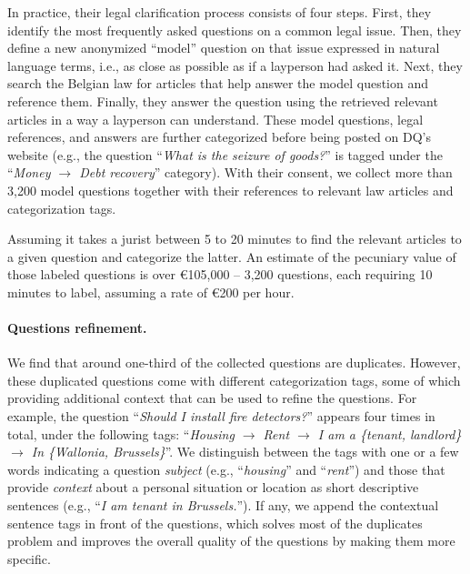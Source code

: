 \documentclass[11pt]{article}
\begin{document}
In practice, their legal clarification process consists of four steps. First, they identify the most frequently asked questions on a common legal issue. Then, they define a new anonymized “model” question on that issue expressed in natural language terms, i.e., as close as possible as if a layperson had asked it. Next, they search the Belgian law for articles that help answer the model question and reference them. Finally, they answer the question using the retrieved relevant articles in a way a layperson can understand. These model questions, legal references, and answers are further categorized before being posted on DQ’s website (e.g., the question “\textsl{What is the seizure of goods?}” is tagged under the “\textsl{Money $\rightarrow$ Debt recovery}” category). With their consent, we collect more than 3,200 model questions together with their references to relevant law articles and categorization tags. 

Assuming it takes a jurist between 5 to 20 minutes to find the relevant articles to a given question and categorize the latter. An estimate of the pecuniary value of those labeled questions is over €105,000 -- 3,200 questions, each requiring 10 minutes to label, assuming a rate of €200 per hour.

\paragraph{Questions refinement.}
We find that around one-third of the collected questions are duplicates. However, these duplicated questions come with different categorization tags, some of which providing additional context that can be used to refine the questions. For example, the question ``\textsl{Should I install fire detectors?}'' appears four times in total, under the following tags: ``\textsl{Housing $\rightarrow$ Rent $\rightarrow$ I am a \{\textit{tenant}, \textit{landlord}\} $\rightarrow$ In \{\textit{Wallonia}, \textit{Brussels}\}}''. We distinguish between the tags with one or a few words indicating a question \textit{subject} (e.g., ``\textsl{housing}'' and ``\textsl{rent}'') and those that provide \textit{context} about a personal situation or location as short descriptive sentences (e.g., ``\textsl{I am tenant in Brussels.}''). If any, we append the contextual sentence tags in front of the questions, which solves most of the duplicates problem and improves the overall quality of the questions by making them more specific.
\end{document}

